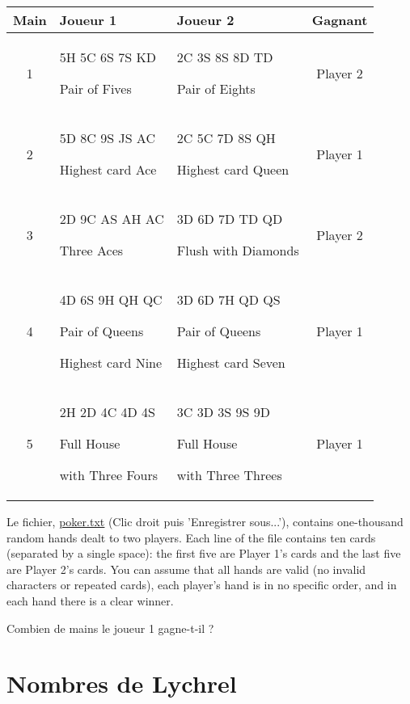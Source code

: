 \begin{center}
    \begin{tabular}{|c|p{4.7cm}|p{4.7cm}|c|}
        \hline
        \textbf{Main} & \textbf{Joueur} 1 & \textbf{Joueur 2} & \textbf{Gagnant}\\
        \hline
        1 & 5H 5C 6S 7S KD \par Pair of Fives & 2C 3S 8S 8D TD \par Pair of Eights  & Player 2\\
        \hline
        2 & 5D 8C 9S JS AC \par Highest card Ace & 2C 5C 7D 8S QH \par Highest card Queen & Player 1\\
        \hline
        3 & 2D 9C AS AH AC \par Three Aces & 3D 6D 7D TD QD \par Flush with Diamonds & Player 2\\
        \hline
        4 & 4D 6S 9H QH QC \par Pair of Queens \par Highest card Nine & 3D 6D 7H QD QS \par Pair of Queens \par Highest card Seven & Player 1\\
        \hline
        5 & 2H 2D 4C 4D 4S \par Full House \par with Three Fours & 3C 3D 3S 9S 9D \par Full House \par with Three Threes & Player 1\\
        \hline
    \end{tabular}
\end{center}


Le fichier, \href{https://projecteuler.net/project/resources/p054_poker.txt}{\underline{poker.txt}} (Clic droit puis 'Enregistrer sous...'), contains one-thousand random hands dealt to two players. Each line of the file contains ten cards (separated by a single space): the first five are Player 1's cards and the last five are Player 2's cards. You can assume that all hands are valid (no invalid characters or repeated cards), each player's hand is in no specific order, and in each hand there is a clear winner.

Combien de mains le joueur 1 gagne-t-il ?

\section{Nombres de Lychrel} \label{pb.055}

